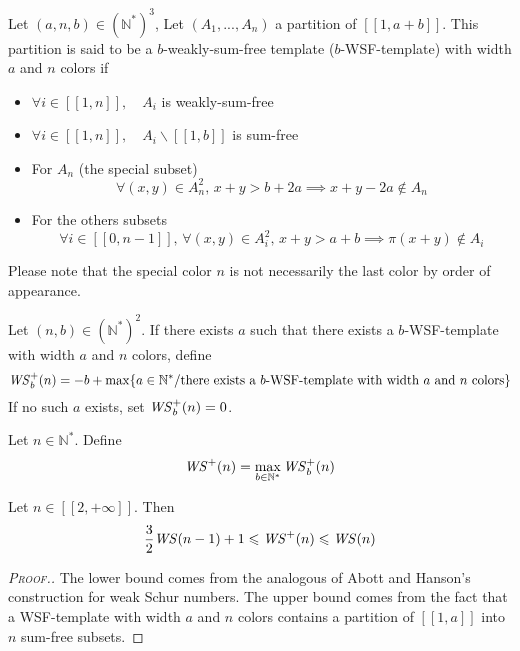 \begin{definition}
Let \( (a,n,b) \in (\mathbb{N}^*)^3\), Let \((A_1,...,A_n)\) a partition of  \([\![1, a + b]\!]\).
This partition is said to be a \(b\)-weakly-sum-free template (\(b\)-WSF-template) with width \(a\) and \(n\) colors if

\begin{itemize}
\item \(\forall i \in [\![1, n]\!], \quad A_i\) is weakly-sum-free
\item \(\forall i \in [\![1, n]\!], \quad A_i\backslash [\![1, b]\!]\) is sum-free
\item For \(A_n\) (the special subset)
	\[
	\forall (x,y) \in A_n^2, \,x+y>b+2a \implies x+y-2a\notin A_n
	\]
\item For the others subsets
	\[
	\forall i \in [\![0,n-1]\!], \, \forall(x,y) \in A_i^2, \, x+y>a+b \implies \pi(x+y) \notin A_i
	\]
\end{itemize}
\end{definition}

Please note that the special color \(n\) is not necessarily the last color by order of appearance.

\begin{definition}
Let \( (n,b) \in (\mathbb{N}^*)^2\). If there exists \(a\) such that there exists a \(b\)-WSF-template with width \(a\) 
and \(n\) colors, define
\[
\mathit{WS}_b^+(n)=-b+\max \{a \in \mathbb{N}^*/ \text{there exists a } b \text{-WSF-template with width } a \text{ and } n \text{ colors} \}
\]
If no such \(a\) exists, set \(\mathit{WS}_b^+(n) = 0\).
\end{definition}

\begin{definition}
Let \( n \in \mathbb{N}^*\). Define 
\[
\mathit{WS}^+(n)=\max_{b\in \mathbb{N}^*} \mathit{WS}_b^+(n)
\]
\end{definition}

\begin{proposition}
Let \(n \in [\![2, +\infty]\!]\). Then
\[
\frac{3}{2} \mathit{WS} (n-1)+1 \leqslant \mathit{WS}^+(n) \leqslant \mathit{WS} (n)
\]
\end{proposition}

\begin{proof}[\textsc{Proof.}]
The lower bound comes from the analogous of Abott and Hanson's construction for weak Schur numbers.
The upper bound comes from the fact that a WSF-template with width \(a\) and \(n\) colors contains a partition of
\([\![1, a]\!]\) into \(n\) sum-free subsets.
\end{proof}

